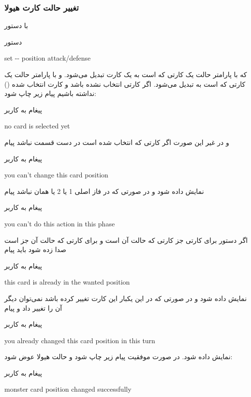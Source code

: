 \documentclass[]{article}
\begin{document}
\subsubsection*{{\titr تغییر حالت کارت هیولا
}}
    با دستور
\begin{mybox}[colback=yellow]{دستور}
	\begin{latin}	
		set -{}- position attack/defense
	\end{latin}
\end{mybox}
که با پارامتر  حالت یک کارتی که  است به یک کارت  تبدیل می‌شود.
و با پارامتر 
    حالت یک کارتی که  است به  تبدیل می‌شود.
    اگر کارتی انتخاب نشده باشد و کارت انتخاب شده () نداشته 
    باشیم پیام زیر چاپ شود:
\begin{mybox}[colback=yellow]{پیغام به کاربر}
	\begin{latin}	
		no card is selected yet
	\end{latin}
\end{mybox}
و در غیر این صورت اگر کارتی که انتخاب شده است در دست قسمت
 نباشد پیام
\begin{mybox}[colback=yellow]{پیغام به کاربر}
\begin{latin}	
	you can’t change this card position
\end{latin}
\end{mybox}
نمایش داده شود و در صورتی که در فاز اصلی 1 یا 2 یا همان  
نباشد پیام
\begin{mybox}[colback=yellow]{پیغام به کاربر}
	\begin{latin}	
		you can’t do this action in this phase
	\end{latin}
\end{mybox}
اگر دستور  برای کارتی جز کارتی که حالت آن  است و 
 برای کارتی که حالت آن جز  است صدا زده شود باید 
پیام
\begin{mybox}[colback=yellow]{پیغام به کاربر}
	\begin{latin}	
	    this card is already in the wanted position		
	\end{latin}
\end{mybox}
نمایش داده شود و در صورتی که در این  یکبار  این کارت 
تغییر کرده باشد نمی‌توان دیگر آن را تغییر داد و پیام
\begin{mybox}[colback=yellow]{پیغام به کاربر}
	\begin{latin}	
		you already changed this card position in this turn		
	\end{latin}
\end{mybox}
نمایش داده شود. در صورت موفقیت پیام زیر چاپ شود و حالت هیولا عوض شود:
\begin{mybox}[colback=yellow]{پیغام به کاربر}
	\begin{latin}	
		monster card position changed successfully
	\end{latin}
\end{mybox}
\end{document}
